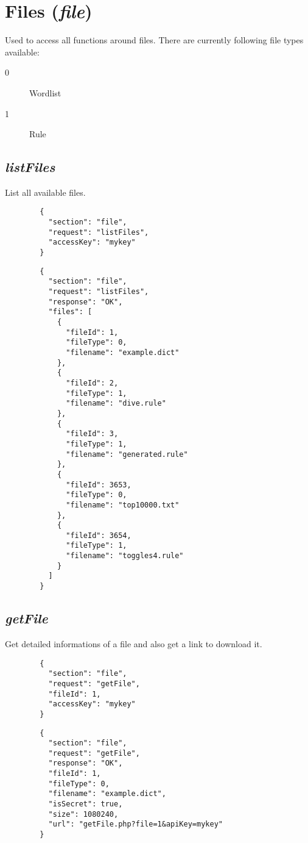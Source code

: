 \section*{Files (\textit{file})}
	Used to access all functions around files. There are currently following file types available:
	\begin{description}
		\item[0] Wordlist
		\item[1] Rule
	\end{description}
	
\subsection*{\textit{listFiles}}
	List all available files.
	{
		\color{blue}
		\begin{verbatim}
		{
		  "section": "file",
		  "request": "listFiles",
		  "accessKey": "mykey"
		}
		\end{verbatim}
	}
	{
		\color{OliveGreen}
		\begin{verbatim}
		{
		  "section": "file",
		  "request": "listFiles",
		  "response": "OK",
		  "files": [
		    {
		      "fileId": 1,
		      "fileType": 0,
		      "filename": "example.dict"
		    },
		    {
		      "fileId": 2,
		      "fileType": 1,
		      "filename": "dive.rule"
		    },
		    {
		      "fileId": 3,
		      "fileType": 1,
		      "filename": "generated.rule"
		    },
		    {
		      "fileId": 3653,
		      "fileType": 0,
		      "filename": "top10000.txt"
		    },
		    {
		      "fileId": 3654,
		      "fileType": 1,
		      "filename": "toggles4.rule"
		    }
		  ]
		}
		\end{verbatim}
	}
\subsection*{\textit{getFile}}
	Get detailed informations of a file and also get a link to download it.
	{
		\color{blue}
		\begin{verbatim}
		{
		  "section": "file",
		  "request": "getFile",
		  "fileId": 1,
		  "accessKey": "mykey"
		}
		\end{verbatim}
	}
	{
		\color{OliveGreen}
		\begin{verbatim}
		{
		  "section": "file",
		  "request": "getFile",
		  "response": "OK",
		  "fileId": 1,
		  "fileType": 0,
		  "filename": "example.dict",
		  "isSecret": true,
		  "size": 1080240,
		  "url": "getFile.php?file=1&apiKey=mykey"
		}
		\end{verbatim}
	}
